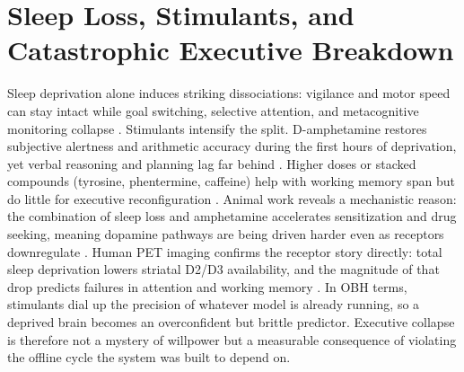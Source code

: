 \section{Sleep Loss, Stimulants, and Catastrophic Executive Breakdown}\label{sec:executive_breakdown}
Sleep deprivation alone induces striking dissociations: vigilance and motor speed can stay intact while goal switching,
selective attention, and metacognitive monitoring collapse \citep{couyoumdjian2010, slama2018, garcia2021}. Stimulants intensify the
split. D-amphetamine restores subjective alertness and arithmetic accuracy during the first hours of deprivation, yet verbal
reasoning and planning lag far behind \citep{newhouse1989}. Higher doses or stacked compounds (tyrosine, phentermine, caffeine) help
with working memory span but do little for executive reconfiguration \citep{magill2003}. Animal work reveals a mechanistic reason: the
combination of sleep loss and amphetamine accelerates sensitization and drug seeking, meaning dopamine pathways are being driven
harder even as receptors downregulate \citep{berro2018, saito2014}. Human PET imaging confirms the receptor story directly: total sleep
deprivation lowers striatal D2/D3 availability, and the magnitude of that drop predicts failures in attention and working memory
\citep{volkow2012, seeman2011}. In OBH terms, stimulants dial up the precision of whatever model is already running, so a deprived
brain becomes an overconfident but brittle predictor. Executive collapse is therefore not a mystery of willpower but a measurable
consequence of violating the offline cycle the system was built to depend on.
